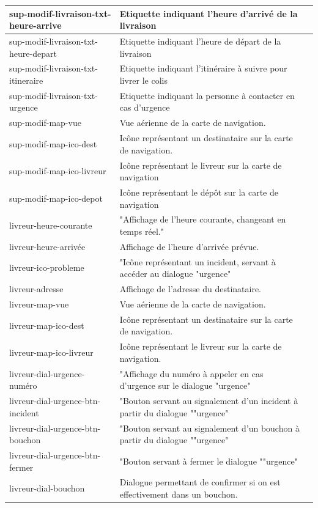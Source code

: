 \documentclass{report}
\begin{document}
\begin{longtable}{|p{5cm}|p{5cm}|c|}
sup-modif-livraison-txt-heure-arrive&Etiquette indiquant l'heure d'arrivé de la livraison&\\\hline
sup-modif-livraison-txt-heure-depart&Etiquette indiquant l'heure de départ de la livraison&\\\hline
sup-modif-livraison-txt-itineraire&Etiquette indiquant l'itinéraire à suivre pour livrer le colis&\\\hline
sup-modif-livraison-txt-urgence&Etiquette indiquant la personne à contacter en cas d'urgence&\\\hline
sup-modif-map-vue&Vue aérienne de la carte de navigation.&\\\hline
sup-modif-map-ico-dest&Icône représentant un destinataire sur la carte de navigation.&\\\hline
sup-modif-map-ico-livreur&Icône représentant le livreur sur la carte de navigation&\\\hline
sup-modif-map-ico-depot&Icône représentant le dépôt sur la carte de navigation&\\\hline
livreur-heure-courante&"Affichage de l'heure courante, changeant en temps réel."&\\\hline
livreur-heure-arrivée&Affichage de l'heure d'arrivée prévue.&\\\hline
livreur-ico-probleme&"Icône représentant un incident, servant à accéder au dialogue "urgence"&\\\hline
livreur-adresse&Affichage de l'adresse du destinataire.&\\\hline
livreur-map-vue&Vue aérienne de la carte de navigation.&\\\hline
livreur-map-ico-dest&Icône représentant un destinataire sur la carte de navigation.&\\\hline
livreur-map-ico-livreur&Icône représentant le livreur sur la carte de navigation.&\\\hline
livreur-dial-urgence-numéro&"Affichage du numéro à appeler en cas d'urgence sur le dialogue "urgence"&\\\hline
livreur-dial-urgence-btn-incident&"Bouton servant au signalement d'un incident à partir du dialogue ""urgence"&\\\hline
livreur-dial-urgence-btn-bouchon&"Bouton servant au signalement d'un bouchon à partir du dialogue ""urgence"&\\\hline
livreur-dial-urgence-btn-fermer&"Bouton servant à fermer le dialogue ""urgence"&\\\hline
livreur-dial-bouchon&Dialogue permettant de confirmer si on est effectivement dans un bouchon.&\\\hline

\end{longtable}
\end{document}
